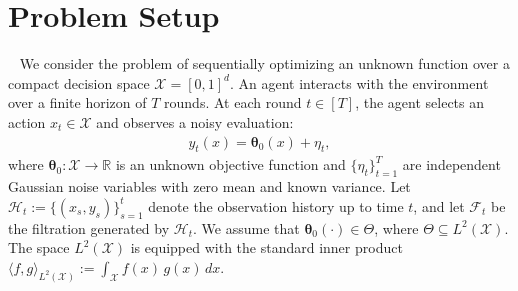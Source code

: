 \documentclass[final,12pt]{colt2026} %
\begin{document}
\section{Problem Setup}~\label{sec:Prob}
We consider the problem of sequentially optimizing an unknown function over a compact decision space $\mathcal{X} = [0,1]^d$. An agent interacts with the environment over a finite horizon of $T$ rounds. At each round $t \in [T]$, the agent selects an action $x_t \in \mathcal{X}$ and observes a noisy evaluation:
\begin{align}\label{eq:regression-setting}
y_t(x) = \pmb\theta_0(x) + \eta_t,
\end{align}
where $\pmb\theta_0 : \mathcal{X} \to \mathbb{R}$ is an unknown objective function and $\{\eta_t\}_{t=1}^T$ are independent Gaussian noise variables with zero mean and known variance. Let $\mathcal{H}_t := \{(x_s, y_s)\}_{s=1}^t$ denote the observation history up to time $t$, and let $\mathcal{F}_t$ be the filtration generated by $\mathcal{H}_t$. We assume that $\pmb\theta_0(\cdot) \in \Theta$, where $\Theta \subseteq L^2(\mathcal{X})$. The space $L^2(\mathcal{X})$ is equipped with the standard inner product
\(
\langle f, g \rangle_{L^2(\mathcal{X})} := \int_{\mathcal{X}} f(x)\, g(x)\, dx.\)
\end{document}
